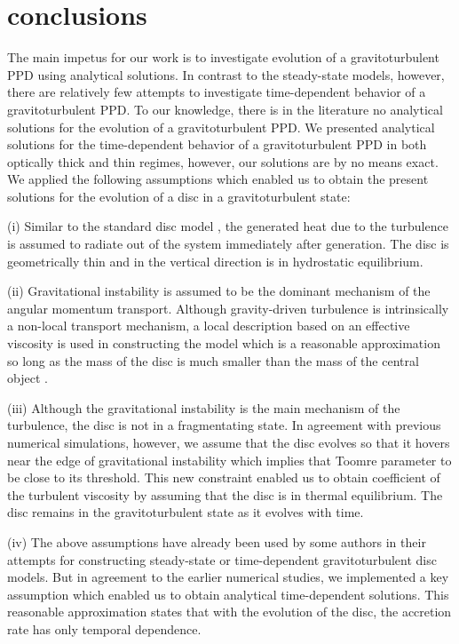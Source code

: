 \documentclass[apj]{emulateapj}
\begin{document}
\section{conclusions}
%
%
The main impetus for our work is to investigate evolution of a gravitoturbulent PPD using analytical solutions. In contrast to the steady-state models, however, there are relatively few attempts to investigate time-dependent behavior of a gravitoturbulent PPD. To our knowledge, there is in the literature no analytical solutions for the evolution of a gravitoturbulent PPD. We presented analytical solutions for the time-dependent behavior of a gravitoturbulent PPD in both optically thick and thin regimes, however, our solutions are by no means exact.  We applied the following assumptions which enabled us to obtain the present solutions for the evolution of a disc in a gravitoturbulent state:

 (i) Similar to the standard disc model \citep{SSmodel}, the generated heat due to the turbulence is assumed to radiate out of the system immediately after generation. The disc is geometrically thin and in the vertical direction is in hydrostatic equilibrium. 
 
 (ii) Gravitational instability is assumed to be the dominant mechanism of the angular momentum transport. Although gravity-driven turbulence is intrinsically a non-local transport mechanism, a local description based on an effective viscosity is used in constructing the model which is a reasonable approximation so long as the mass of the disc is much smaller than the mass of the central object \citep{Balbus99,Lodato2004}.
 
 (iii) Although the gravitational instability is the main mechanism of the turbulence, the disc is not in a fragmentating state. In agreement with previous numerical simulations, however, we assume that the disc evolves so that it hovers  near the edge of gravitational instability which implies that Toomre parameter to be close to its threshold. This new constraint enabled us to obtain coefficient of the turbulent viscosity by assuming that the disc is in thermal equilibrium. The disc remains in the gravitoturbulent state as it evolves with time.
 
 (iv) The above assumptions have already been used by some authors in their attempts for constructing steady-state or time-dependent gravitoturbulent disc models. But in agreement to the earlier numerical studies, we implemented a key assumption which enabled us to obtain analytical time-dependent solutions. This reasonable approximation states that with the evolution of the disc, the accretion rate has only temporal dependence.
\end{document}
